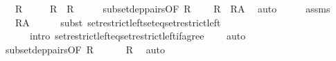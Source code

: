 \begin{isabellebody}
\ \ \ {\isachardoublequoteopen}R{\isacharprime}{\kern0pt}\ {\isasymin}\ {\isasymR}{\isachardoublequoteclose}\isanewline
\ \ \ {\isachardoublequoteopen}R\ {\isacharequal}{\kern0pt}\ R{\isacharprime}{\kern0pt}{\isachardoublequoteclose}\isanewline
%
\isadelimproof
%
\endisadelimproof
%
\isatagproof
{}\isamarkupfalse%
\ {\isacharminus}{\kern0pt}\isanewline
\ \ \isamarkupfalse%
\ subset{\isacharunderscore}{\kern0pt}dep{\isacharunderscore}{\kern0pt}pairs{\isacharbrackleft}{\kern0pt}OF\ {\isacartoucheopen}R\ {\isasymin}\ {\isasymR}{\isacartoucheclose}{\isacharbrackright}{\kern0pt}\ \isamarkupfalse%
\ {\isachardoublequoteopen}R\ {\isacharequal}{\kern0pt}\ R{\isasymrestriction}\isactrlbsub A\isactrlesub {\isachardoublequoteclose}\ \isamarkupfalse%
\ auto\isanewline
\ \ \isamarkupfalse%
\ \isamarkupfalse%
\ assms\ \isamarkupfalse%
\ {\isachardoublequoteopen}{\isachardot}{\kern0pt}{\isachardot}{\kern0pt}{\isachardot}{\kern0pt}\ {\isacharequal}{\kern0pt}\ R{\isacharprime}{\kern0pt}{\isasymrestriction}\isactrlbsub A\isactrlesub {\isachardoublequoteclose}\isanewline
\ \ \ \ \isamarkupfalse%
\ {\isacharparenleft}{\kern0pt}{\isacharparenleft}{\kern0pt}subst\ set{\isacharunderscore}{\kern0pt}restrict{\isacharunderscore}{\kern0pt}left{\isacharunderscore}{\kern0pt}set{\isacharunderscore}{\kern0pt}eq{\isacharunderscore}{\kern0pt}set{\isacharunderscore}{\kern0pt}restrict{\isacharunderscore}{\kern0pt}left{\isacharparenright}{\kern0pt}{\isacharplus}{\kern0pt}{\isacharcomma}{\kern0pt}\isanewline
\ \ \ \ \ \ intro\ set{\isacharunderscore}{\kern0pt}restrict{\isacharunderscore}{\kern0pt}left{\isacharunderscore}{\kern0pt}eq{\isacharunderscore}{\kern0pt}set{\isacharunderscore}{\kern0pt}restrict{\isacharunderscore}{\kern0pt}left{\isacharunderscore}{\kern0pt}if{\isacharunderscore}{\kern0pt}agree{\isacharparenright}{\kern0pt}\isanewline
\ \ \ \ auto\isanewline
\ \ \isamarkupfalse%
\ \isamarkupfalse%
\ subset{\isacharunderscore}{\kern0pt}dep{\isacharunderscore}{\kern0pt}pairs{\isacharbrackleft}{\kern0pt}OF\ {\isacartoucheopen}R{\isacharprime}{\kern0pt}\ {\isasymin}\ {\isasymR}{\isacartoucheclose}{\isacharbrackright}{\kern0pt}\ \isamarkupfalse%
\ {\isachardoublequoteopen}{\isachardot}{\kern0pt}{\isachardot}{\kern0pt}{\isachardot}{\kern0pt}\ {\isacharequal}{\kern0pt}\ R{\isacharprime}{\kern0pt}{\isachardoublequoteclose}\ \isamarkupfalse%
\ auto\isanewline
\ \ \isamarkupfalse%

\end{isabellebody}
